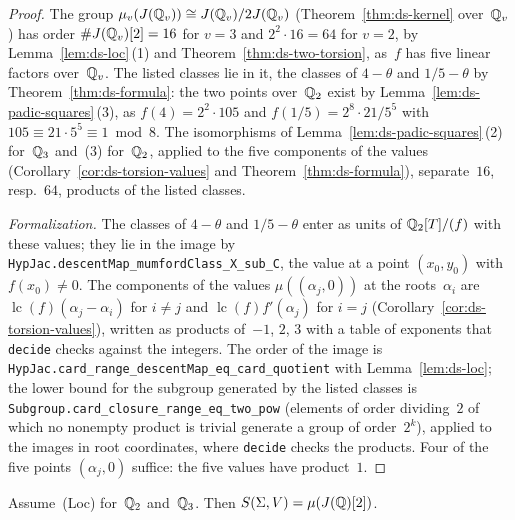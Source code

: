 \begin{proof}
\leanok
The group $\mu_v(J(\mathbb{Q}_v)) \cong J(\mathbb{Q}_v)/2J(\mathbb{Q}_v)$ (Theorem~\ref{thm:ds-kernel} over~$\mathbb{Q}_v$) has
order $\#J(\mathbb{Q}_v)[2] = 16$ for $v = 3$ and $2^2 \cdot 16 = 64$ for $v = 2$, by
Lemma~\ref{lem:ds-loc}\,(1) and Theorem~\ref{thm:ds-two-torsion}, as~$f$ has five linear factors
over~$\mathbb{Q}_v$. The listed classes lie in it, the classes of $4 - \theta$ and $1/5 - \theta$ by
Theorem~\ref{thm:ds-formula}: the two points over~$\mathbb{Q}_2$ exist by
Lemma~\ref{lem:ds-padic-squares}\,(3), as $f(4) = 2^2 \cdot 105$ and
$f(1/5) = 2^8 \cdot 21/5^5$ with $105 \equiv 21 \cdot 5^5 \equiv 1 \bmod 8$. The isomorphisms of
Lemma~\ref{lem:ds-padic-squares}\,(2) for~$\mathbb{Q}_3$ and~(3) for~$\mathbb{Q}_2$, applied to the five
components of the values (Corollary~\ref{cor:ds-torsion-values} and
Theorem~\ref{thm:ds-formula}), separate~$16$, resp.~$64$, products of the listed classes.

\emph{Formalization.} The classes of $4 - \theta$ and $1/5 - \theta$ enter as units of
$\mathbb{Q}_2[T]/(f)$ with these values; they lie in the image by
\texttt{HypJac.descentMap\_mumfordClass\_X\_sub\_C}, the value at a point $(x_0, y_0)$ with
$f(x_0) \ne 0$. The components of the values $\mu((\alpha_j, 0))$ at the roots~$\alpha_i$ are
$\operatorname{lc}(f)(\alpha_j - \alpha_i)$ for $i \ne j$ and $\operatorname{lc}(f) f'(\alpha_j)$
for $i = j$ (Corollary~\ref{cor:ds-torsion-values}), written as products of~$-1$, $2$, $3$ with a
table of exponents that \texttt{decide} checks against the integers. The order of the image is
\texttt{HypJac.card\_range\_descentMap\_eq\_card\_quotient} with Lemma~\ref{lem:ds-loc}; the lower
bound for the subgroup generated by the listed classes is
\texttt{Subgroup.card\_closure\_range\_eq\_two\_pow} (elements of order dividing~$2$ of which no
nonempty product is trivial generate a group of order~$2^k$), applied to the images in root
coordinates, where \texttt{decide} checks the products. Four of the five points $(\alpha_j, 0)$
suffice: the five values have product~$1$.
\end{proof}

\begin{proposition}
\label{prop:ds-e1-sel}
\leanok
{}
Assume~(Loc) for~$\mathbb{Q}_2$ and~$\mathbb{Q}_3$. Then $S(\Sigma, V) = \mu(J(\mathbb{Q})[2])$.
\end{proposition}


